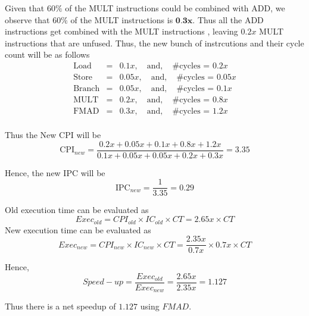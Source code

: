 \documentclass{tufte-handout}
\begin{document}
	Given that $60\%$ of the MULT instructions could be combined with ADD, we observe that $60\%$ of the MULT instructions is $\textbf{0.3x}$. Thus all the ADD instructions get combined with the MULT instructions , leaving $0.2x$ MULT instructions that are unfused. Thus, the new bunch of instrcutions and their cycle count will be as follows
	\begin{eqnarray*}
		\mbox{Load} &=& 0.1 x, \quad\mbox{and}, \quad\mbox{\# cycles = } 0.2x \\
		\mbox{Store} &=& 0.05 x, \quad\mbox{and}, \quad\mbox{\# cycles = } 0.05x \\
		\mbox{Branch} &=& 0.05 x, \quad\mbox{and}, \quad\mbox{\# cycles = } 0.1x \\
		\mbox{MULT} &=& 0.2 x, \quad\mbox{and}, \quad\mbox{\# cycles = } 0.8x \\
		\mbox{FMAD} &=& 0.3 x, \quad\mbox{and}, \quad\mbox{\# cycles = } 1.2x \\
	\end{eqnarray*}

	Thus the New CPI will be
	\[\mbox{CPI}_{new} = \dfrac{0.2x + 0.05x + 0.1x + 0.8x + 1.2x}{0.1x + 0.05x + 0.05x + 0.2x + 0.3x} = 3.35 \]

	Hence, the new IPC will be
	\[\mbox{IPC}_{new} = \dfrac{1}{3.35} = 0.29 \]

	Old execution time can be evaluated as
	\[Exec_{old} = CPI_{old} \times IC_{old} \times CT = 2.65x \times CT\]
	New execution time can be evaluated as
	\[Exec_{new} = CPI_{new} \times IC_{new} \times CT = \dfrac{2.35x}{0.7x} \times 0.7x \times CT\]

	Hence, 
	\[
		Speed-up = \dfrac{Exec_{old}}{Exec_{new}} = \dfrac{2.65x}{2.35x} = 1.127
	\]

	Thus there is a net speedup of $1.127$ using $FMAD$.

  
  
  
  
\end{document}
